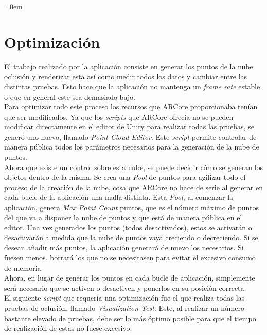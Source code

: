\parindent=0em
\section{Optimización}
\noindent

El trabajo realizado por la aplicación consiste en generar los puntos de la nube oclusión y renderizar esta así como medir todos los datos y cambiar entre las distintas pruebas. Esto hace que la aplicación no mantenga un \textit{frame rate} estable o que en general este sea demasiado bajo.\\

Para optimizar todo este proceso los recursos que ARCore proporcionaba tenían que ser modificados. Ya que los \textit{scripts} que ARCore ofrecía no se pueden modificar directamente en el editor de Unity para realizar todas las pruebas, se generó uno nuevo, llamado \textit{Point Cloud Editor}. Este \textit{script} permite controlar de manera pública todos los parámetros necesarios para la generación de la nube de puntos.\\

Ahora que existe un control sobre esta nube, se puede decidir cómo se generan los objetos dentro de la misma. Se crea una \textit{Pool} de puntos para agilizar todo el proceso de la creación de la nube, cosa que ARCore no hace de serie al generar en cada bucle de la aplicación una malla distinta. Esta \textit{Pool}, al comenzar la aplicación, genera \textit{Max Point Count} puntos, que es el número máximo de puntos del que va a disponer la nube de puntos y que está de manera pública en el editor. Una vez generados los puntos (todos desactivados), estos se activarán o desactivarán a medida que la nube de puntos vaya creciendo o decreciendo. Si se desean añadir más puntos, la aplicación generará de nuevo los necesarios. Si fuesen menos, borrará los que no se necesitasen para evitar el excesivo consumo de memoria.\\

Ahora, en lugar de generar los puntos en cada bucle de aplicación, simplemente será necesario que se activen o desactiven y ponerlos en su posición correcta.\\

El siguiente \textit{script} que requería una optimización fue el que realiza todas las pruebas de oclusión, llamado \textit{Visualization Test}. Este, al realizar un número bastante elevado de pruebas, debe ser lo más óptimo posible para que el tiempo de realización de estas no fuese excesivo.\\

